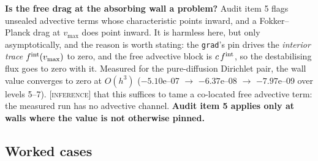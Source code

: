 \documentclass[10pt]{article}
\newcommand{\code}[1]{\texttt{#1}}
\newcommand{\INF}{\textcolor{red!60!black}{\textsc{[inference]}}}
\begin{document}
\textbf{Is the free drag at the absorbing wall a problem?} Audit item 5 flags
unsealed advective terms whose characteristic points inward, and a
Fokker--Planck drag at $v_{\max}$ does point inward. It is harmless here, but only
asymptotically, and the reason is worth stating: the \code{grad}'s pin drives the
\emph{interior trace} $f^{\rm int}(v_{\max})$ to zero, and the free advective
block is $c\,f^{\rm int}$, so the destabilising flux goes to zero with it.
Measured for the pure-diffusion Dirichlet pair, the wall value converges to zero
at $O(h^3)$ ($-5.10$e--07 $\to$ $-6.37$e--08 $\to$ $-7.97$e--09 over levels
5--7). \INF{} that this suffices to tame a co-located free advective term: the
measured run has no advective channel. \textbf{Audit item 5 applies only at walls
where the value is not otherwise pinned.}

\subsection{Worked cases}
\end{document}
